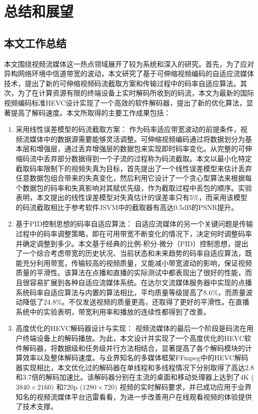 \chapter{总结和展望}

\section{本文工作总结}

本文围绕视频流媒体这一热点领域展开了较为系统和深入的研究。首先，为了应对异构网络环境中信道带宽的波动，本文研究了基于可伸缩视频编码的自适应流媒体技术，提出了新的可伸缩视频码流截取方案和传输过程中的码率自适应算法。其次，为了在计算资源有限的终端设备上实时解码所收到的码流，本文为最新的国际视频编码标准HEVC设计实现了一个高效的软件解码器，提出了新的优化算法，显著提高了解码速度。本文所取得的主要工作成果包括：
\begin{enumerate}
\item {采用线性误差模型的码流截取方案：}
作为码率适应带宽波动的前提条件，视频流媒体中的数据源需要能够灵活调整。可伸缩视频编码通过将数据划分为基本层和增强层，通过丢弃增强层的数据包来实现即时码率变化。从完整的可伸缩码流中丢弃部分数据得到一个子流的过程称为码流截取。本文以最小化特定截取码率限制下的视频失真为目标，首先提出了一个线性误差模型来估计丢弃任意数据包组合带来的失真变化，然后利用它设计了一个贪心型算法来根据每个数据包的码率和失真影响对其赋优先级，作为截取过程中丢包的顺序。实验表明，本文提出的线性误差模型对失真估计的误差率只有5\%，而采用该模型的码流截取相比于参考软件JSVM中的截取器有高达0.5dB的PSNR提升。
\item {基于PID控制思想的码率自适应算法：}
自适应流媒体的另一个关键问题是传输过程中的码率调整策略，即在可用带宽不断变化的情况下，决定何时调整码率并确定调整到多少。本文基于经典的比例-积分-微分（PID）控制思想，提出了一个综合考虑带宽的历史状况、当前状态和未来趋势的码率自适应算法，既能充分利用带宽，传输较高的视频质量，又能减小带宽波动的影响，保证视频质量的平滑性。该算法在点播和直播的实际测试中都表现出了很好的性能，而且很容易扩展到各种自适应流媒体系统。在达尔文流媒体服务器中实现的点播系统码率自适应算法与内置的算法相比，平均质量等级提高了8.6\%，而质量波动降低了24.8\%。不仅发送视频的质量更高，还取得了更好的平滑性。在直播系统中的实验表明，带宽利用率和播放的连续性都得到了改善。
\item {高度优化的HEVC解码器设计与实现：}
视频流媒体的最后一个阶段是码流在用户终端设备上的解码播放。为此，本文设计并实现了一个高度优化的HEVC软件解码器，将数据级和任务级并行方法相结合，显著提高了各个解码模块的计算效率以及整体解码速度。与业界知名的多媒体框架FFmpeg中的HEVC解码器实现相比，本文优化过的解码器在单线程和多线程情况下分别取得了高达2.8和3.7倍的解码加速比。该解码器分别在主流的桌面和移动处理器上达到了4K ($3840 \times 2160$) 和720p ($1280 \times 720$) 视频的实时解码要求，并已成功应用于业界知名的视频流媒体平台迅雷看看，为进一步改善用户在线观看视频的体验提供了技术支撑。
\end{enumerate}

